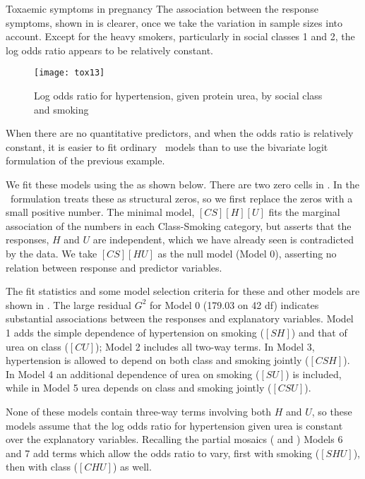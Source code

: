 \begin{Example}[toxaemia]{Toxaemic symptoms in pregnancy}
The association between the response symptoms,
shown in 
is clearer, once we take the variation in sample sizes into account.
Except for the heavy smokers, particularly  in social classes 1 and 2, the log odds ratio
appears to be relatively constant.
\begin{figure}[htb]
  \centering
  \texttt{[image: tox13]}
  \caption{Log odds ratio for hypertension, given protein urea, by social class and smoking}%
  \label{fig:tox13}
\end{figure}

When there are no quantitative predictors, and when the odds ratio is
relatively constant, it is easier to fit ordinary \loglin\ models
than to use the bivariate logit formulation of the previous example.

We fit these models using the  as shown below.
There are two zero cells in .
In the \loglin\ formulation  treats these as structural
zeros, so we first replace the zeros with a small positive number.
The minimal model, $[CS] [H] [U]$ fits the marginal association of the
numbers in each Class-Smoking category, but asserts that the responses,
$H$ and $U$ are independent, which we have already seen is contradicted
by the data.  We take $[CS] [HU]$ as the null model (Model 0), asserting no relation
between response and predictor variables.


The fit statistics and some model selection criteria for these and other
models are shown in .
The large residual $G^2$ for Model 0 (179.03 on 42 df) indicates substantial
associations between the responses and explanatory variables.
Model 1 adds the simple dependence of hypertension on smoking ($[SH]$) and that of urea on class ($[CU]$); Model 2 includes all two-way terms.
In Model 3, hypertension is allowed to depend on both class and smoking
jointly ($[CSH]$). In Model 4 an additional dependence of
urea on smoking ($[SU]$) is included, while in Model 5 urea depends on
class and smoking jointly ($[CSU]$).


None of these models contain three-way terms involving both $H$ and $U$,
so these models assume that the log odds ratio for hypertension given urea
is constant over the explanatory variables.
Recalling the partial mosaics ( and )  Models 6 and 7 add terms
which allow the odds ratio to vary, first with smoking ($[SHU]$), then
with class ($[CHU]$) as well.


\end{Example}
